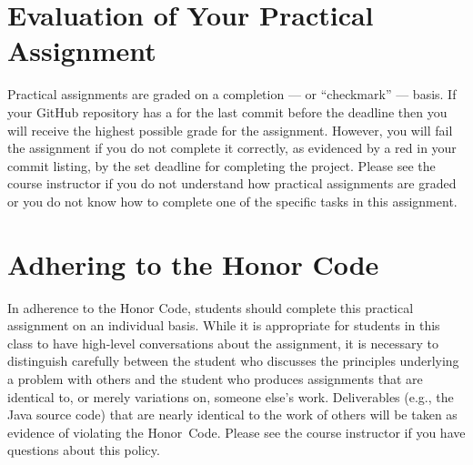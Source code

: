 \documentclass[11pt]{article}
\newcommand{\checkmark}{\ding{51}}
\newcommand{\naughtmark}{\ding{55}}
\begin{document}
\section*{Evaluation of Your Practical Assignment}

Practical assignments are graded on a completion --- or ``checkmark'' --- basis.
If your GitHub repository has a \checkmark{} for the last commit before the
deadline then you will receive the highest possible grade for the assignment.
However, you will fail the assignment if you do not complete it correctly, as
evidenced by a red \naughtmark{} in your commit listing, by the set deadline for
completing the project. Please see the course instructor if you do not
understand how practical assignments are graded or you do not know how to
complete one of the specific tasks in this assignment.

\section*{Adhering to the Honor Code}

In adherence to the Honor Code, students should complete this practical assignment on an individual basis. While it is
appropriate for students in this class to have high-level conversations about the assignment, it is necessary to
distinguish carefully between the student who discusses the principles underlying a problem with others and the student
who produces assignments that are identical to, or merely variations on, someone else's work. Deliverables (e.g., the
Java source code) that are nearly identical to the work of others will be taken as evidence of violating the \mbox{Honor
Code}. Please see the course instructor if you have questions about this policy.
\end{document}
